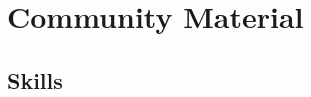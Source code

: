 \documentclass[10pt]{report}
\begin{document}
\chapter{Community Material}


\section{Skills}

%


\end{document}
